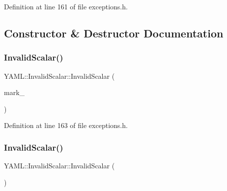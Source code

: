 Definition at line 161 of file exceptions.\+h.



\subsection{Constructor \& Destructor Documentation}
\mbox{\label{class_y_a_m_l_1_1_invalid_scalar_a2a8fd52ce4e2ff82ec32f7e9a9557ef3}} 
\subsubsection{\texorpdfstring{InvalidScalar()}{InvalidScalar()}\hspace{0.1cm}{\footnotesize\ttfamily [1/2]}}
{\footnotesize\ttfamily Y\+A\+M\+L\+::\+Invalid\+Scalar\+::\+Invalid\+Scalar (\begin{DoxyParamCaption}\item[{const \mbox{\hyperlink{struct_y_a_m_l_1_1_mark}{Mark}} \&}]{mark\+\_\+ }\end{DoxyParamCaption})\hspace{0.3cm}{\ttfamily [inline]}}



Definition at line 163 of file exceptions.\+h.

\mbox{\label{class_y_a_m_l_1_1_invalid_scalar_a20d31dd3e10f8d84daa18bf69c8a5670}} 
\subsubsection{\texorpdfstring{InvalidScalar()}{InvalidScalar()}\hspace{0.1cm}{\footnotesize\ttfamily [2/2]}}
{\footnotesize\ttfamily Y\+A\+M\+L\+::\+Invalid\+Scalar\+::\+Invalid\+Scalar (\begin{DoxyParamCaption}\item[{const \mbox{\hyperlink{class_y_a_m_l_1_1_invalid_scalar}{Invalid\+Scalar}} \&}]{ }\end{DoxyParamCaption})\hspace{0.3cm}{\ttfamily [default]}}

